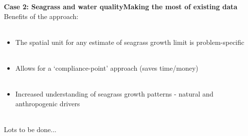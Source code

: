 \documentclass[serif]{beamer}\usepackage[]{graphicx}\usepackage[]{color}
\begin{document}
\begin{frame}{\textbf{Case 2: Seagrass and water quality}}{\textbf{Making the most of existing data}}
\onslide<+->
Benefits of the approach: \\~\\
\begin{itemize}
\item The spatial unit for any estimate of seagrass growth limit is problem-specific \\~\\
\item Allows for a `compliance-point' approach (saves time/money) \\~\\
\item Increased understanding of seagrass growth patterns - natural and anthropogenic drivers \\~\\
\end{itemize}
\onslide<+->
Lots to be done...
\end{frame}
\end{document}
